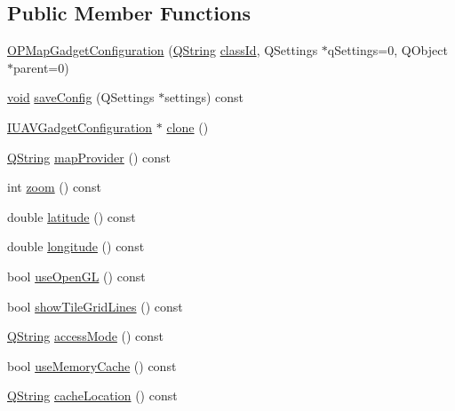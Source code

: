 \subsection*{\-Public \-Member \-Functions}
\begin{DoxyCompactItemize}
\item 
\hyperlink{group___o_p_map_plugin_gad087f5e0479a0571692363c3771744be}{\-O\-P\-Map\-Gadget\-Configuration} (\hyperlink{group___u_a_v_objects_plugin_gab9d252f49c333c94a72f97ce3105a32d}{\-Q\-String} \hyperlink{group___core_plugin_gac953657221ba7fda967ada0408332641}{class\-Id}, \-Q\-Settings $\ast$q\-Settings=0, \-Q\-Object $\ast$parent=0)
\item 
\hyperlink{group___u_a_v_objects_plugin_ga444cf2ff3f0ecbe028adce838d373f5c}{void} \hyperlink{group___o_p_map_plugin_ga6bbc8206c2e47f0a2fbee16ae3714fb1}{save\-Config} (\-Q\-Settings $\ast$settings) const 
\item 
\hyperlink{group___core_plugin_gacdfdf0b1e39b5002472b76b6564ce51f}{\-I\-U\-A\-V\-Gadget\-Configuration} $\ast$ \hyperlink{group___o_p_map_plugin_gad04d5a814a94033d32e4bbb42321c105}{clone} ()
\item 
\hyperlink{group___u_a_v_objects_plugin_gab9d252f49c333c94a72f97ce3105a32d}{\-Q\-String} \hyperlink{group___o_p_map_plugin_ga377c1d600009ec04bfa92e3a259c7071}{map\-Provider} () const 
\item 
int \hyperlink{group___o_p_map_plugin_ga0e5e3cbf297d14ff236edcf0ce5f4c8f}{zoom} () const 
\item 
double \hyperlink{group___o_p_map_plugin_gaa2e49a8d2ff144343b4467f078374b0a}{latitude} () const 
\item 
double \hyperlink{group___o_p_map_plugin_ga3faeb4ba6e69dd97e9f8451b35e47c7e}{longitude} () const 
\item 
bool \hyperlink{group___o_p_map_plugin_ga1b6fe88d155611b041e3e1e9213f1ab5}{use\-Open\-G\-L} () const 
\item 
bool \hyperlink{group___o_p_map_plugin_ga6bea5e6009e16f4a53c4e235dfd1594b}{show\-Tile\-Grid\-Lines} () const 
\item 
\hyperlink{group___u_a_v_objects_plugin_gab9d252f49c333c94a72f97ce3105a32d}{\-Q\-String} \hyperlink{group___o_p_map_plugin_ga2a0ae25b0c5f6fb24f2b2f791a9fe997}{access\-Mode} () const 
\item 
bool \hyperlink{group___o_p_map_plugin_gae363a6d1100a72e8a2089d08c192bb87}{use\-Memory\-Cache} () const 
\item 
\hyperlink{group___u_a_v_objects_plugin_gab9d252f49c333c94a72f97ce3105a32d}{\-Q\-String} \hyperlink{group___o_p_map_plugin_gabcd898428bb8b8e721deabdec17009e0}{cache\-Location} () const 

\end{DoxyCompactItemize}
